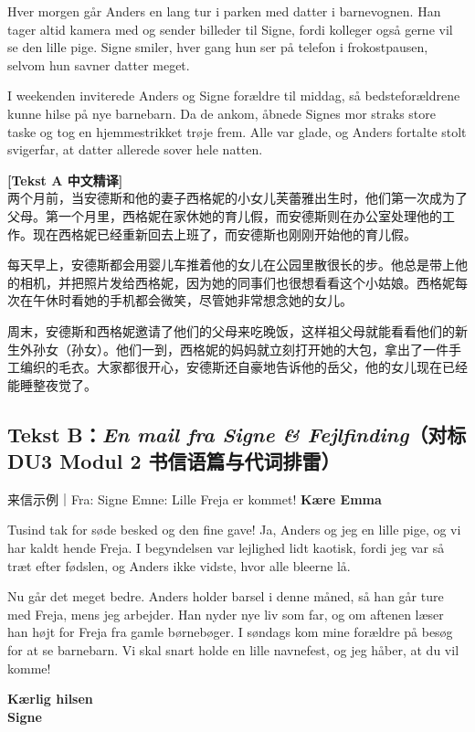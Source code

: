 Hver morgen går Anders en lang tur i parken med  datter i barnevognen. Han tager altid  kamera med og sender billeder til Signe, fordi  kolleger også gerne vil se den lille pige. Signe smiler, hver gang hun ser på  telefon i frokostpausen, selvom hun savner  datter meget.

I weekenden inviterede Anders og Signe  forældre til middag, så bedsteforældrene kunne hilse på  nye barnebarn. Da de ankom, åbnede Signes mor straks  store taske og tog en hjemme\-strikket trøje frem. Alle var glade, og Anders fortalte stolt  svigerfar, at  datter allerede sover hele natten.

\begin{transbox}
\small
\textbf{\color{NCDTeal}[Tekst A 中文精译]}\\
两个月前，当安德斯和他的妻子西格妮的小女儿芙蕾雅出生时，他们第一次成为了父母。第一个月里，西格妮在家休她的育儿假，而安德斯则在办公室处理他的工作。现在西格妮已经重新回去上班了，而安德斯也刚刚开始他的育儿假。

每天早上，安德斯都会用婴儿车推着他的女儿在公园里散很长的步。他总是带上他的相机，并把照片发给西格妮，因为她的同事们也很想看看这个小姑娘。西格妮每次在午休时看她的手机都会微笑，尽管她非常想念她的女儿。

周末，安德斯和西格妮邀请了他们的父母来吃晚饭，这样祖父母就能看看他们的新生外孙女（孙女）。他们一到，西格妮的妈妈就立刻打开她的大包，拿出了一件手工编织的毛衣。大家都很开心，安德斯还自豪地告诉他的岳父，他的女儿现在已经能睡整夜觉了。
\end{transbox}

\subsection*{Tekst B：\textit{En mail fra Signe \& Fejlfinding}（对标 DU3 Modul 2 书信语篇与代词排雷）}

\begin{emailbox}{来信示例｜Fra: Signe \quad Emne: Lille Freja er kommet!}
\textbf{Kære Emma}

Tusind tak for  søde besked og den fine gave! Ja, Anders og jeg  en lille pige, og vi har kaldt hende Freja. I begyndelsen var  lejlighed lidt kaotisk, fordi jeg var så træt efter fødslen, og Anders ikke vidste, hvor alle bleerne lå.

Nu går det meget bedre. Anders holder  barsel i denne måned, så han går ture med Freja, mens jeg arbejder. Han nyder  nye liv som far, og om aftenen læser han højt for Freja fra  gamle børnebøger. I søndags kom mine forældre på besøg for at se  barnebarn. Vi skal snart holde en lille navnefest, og jeg håber, at du vil komme!

\textbf{Kærlig hilsen}\\
\textbf{Signe}
\end{emailbox}

